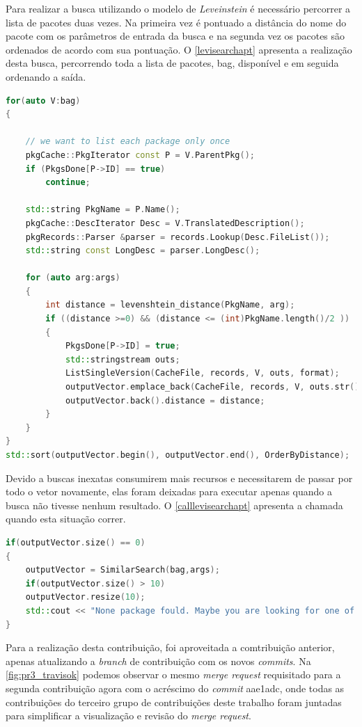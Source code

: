 Para realizar a busca utilizando o modelo de \textit{Leveinstein} é necessário percorrer a lista de pacotes duas vezes. Na primeira vez é pontuado a distância do nome do pacote com os parâmetros de entrada da busca e na segunda vez os pacotes são ordenados de acordo com sua pontuação. O \autoref{levisearchapt} apresenta a realização desta busca, percorrendo toda a lista de pacotes, {\code bag}, disponível e em seguida ordenando a saída.

\begin{lstlisting}[language=C++,label=levisearchapt,caption={Busca ordenada por distância de \textit{Levenshtein}}]
for(auto V:bag)
{

	// we want to list each package only once
	pkgCache::PkgIterator const P = V.ParentPkg();
	if (PkgsDone[P->ID] == true)
		continue;

	std::string PkgName = P.Name();
	pkgCache::DescIterator Desc = V.TranslatedDescription();
	pkgRecords::Parser &parser = records.Lookup(Desc.FileList());
	std::string const LongDesc = parser.LongDesc();

	for (auto arg:args)
	{
		int distance = levenshtein_distance(PkgName, arg);
		if ((distance >=0) && (distance <= (int)PkgName.length()/2 ))
		{
			PkgsDone[P->ID] = true;
			std::stringstream outs;
			ListSingleVersion(CacheFile, records, V, outs, format);
			outputVector.emplace_back(CacheFile, records, V, outs.str());
			outputVector.back().distance = distance;
		}
	}
}
std::sort(outputVector.begin(), outputVector.end(), OrderByDistance);
\end{lstlisting}

Devido a buscas inexatas consumirem mais recursos e necessitarem de passar por todo o vetor novamente, elas foram deixadas para executar apenas quando a busca não tivesse nenhum resultado. O \autoref{calllevisearchapt} apresenta a chamada quando esta situação correr.

\begin{lstlisting}[language=C++,label=calllevisearchapt,caption={Chamada seletiva para buscas inexatas}]
if(outputVector.size() == 0)
{
	outputVector = SimilarSearch(bag,args);
	if(outputVector.size() > 10)
	outputVector.resize(10);
	std::cout << "None package fould. Maybe you are looking for one of those:" << std::endl;
}
\end{lstlisting}


Para a realização desta contribuição, foi aproveitada a comtribuição anterior, apenas atualizando a \textit{branch} de contribuição com os novos \textit{commits}. Na \autoref{fig:pr3_travisok} podemos observar o mesmo \textit{merge request} requisitado para a segunda contribuição agora com o acréscimo do \textit{commit} {\code aae1adc}, onde todas as contribuições do terceiro grupo de contribuições deste trabalho foram juntadas para simplificar a visualização e revisão do \textit{merge request}.

